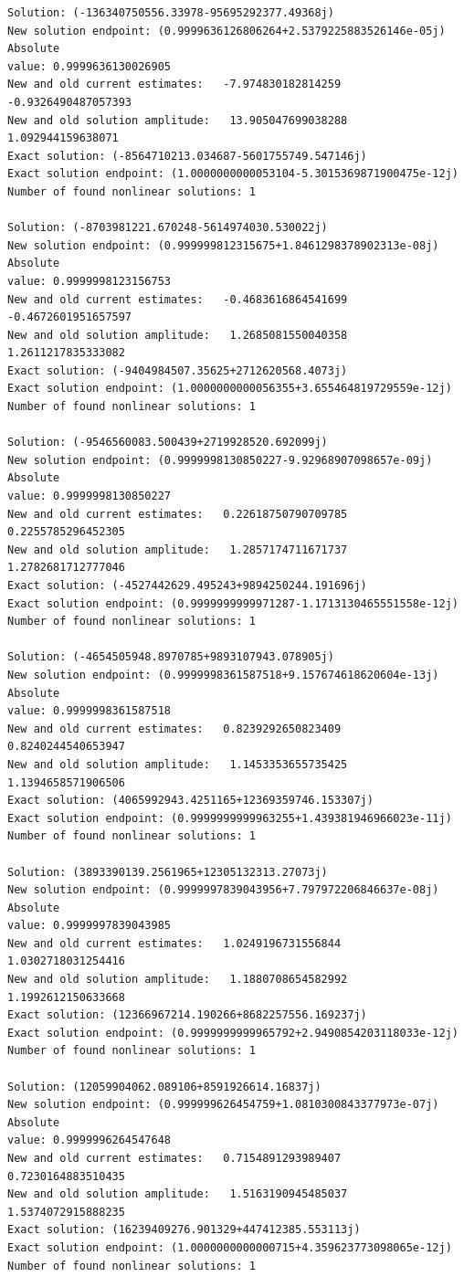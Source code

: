 \documentclass[11pt]{article}
\begin{document}
\begin{Verbatim}[commandchars=\\\{\}]
Solution: (-136340750556.33978-95695292377.49368j)
New solution endpoint: (0.9999636126806264+2.5379225883526146e-05j) Absolute
value: 0.9999636130026905
New and old current estimates:   -7.974830182814259    -0.9326490487057393
New and old solution amplitude:   13.905047699038288    1.092944159638071
Exact solution: (-8564710213.034687-5601755749.547146j)
Exact solution endpoint: (1.0000000000053104-5.3015369871900475e-12j)
Number of found nonlinear solutions: 1

Solution: (-8703981221.670248-5614974030.530022j)
New solution endpoint: (0.999999812315675+1.8461298378902313e-08j) Absolute
value: 0.9999998123156753
New and old current estimates:   -0.4683616864541699    -0.4672601951657597
New and old solution amplitude:   1.2685081550040358    1.2611217835333082
Exact solution: (-9404984507.35625+2712620568.4073j)
Exact solution endpoint: (1.0000000000056355+3.655464819729559e-12j)
Number of found nonlinear solutions: 1

Solution: (-9546560083.500439+2719928520.692099j)
New solution endpoint: (0.9999998130850227-9.92968907098657e-09j) Absolute
value: 0.9999998130850227
New and old current estimates:   0.22618750790709785    0.2255785296452305
New and old solution amplitude:   1.2857174711671737    1.2782681712777046
Exact solution: (-4527442629.495243+9894250244.191696j)
Exact solution endpoint: (0.9999999999971287-1.1713130465551558e-12j)
Number of found nonlinear solutions: 1

Solution: (-4654505948.8970785+9893107943.078905j)
New solution endpoint: (0.9999998361587518+9.157674618620604e-13j) Absolute
value: 0.9999998361587518
New and old current estimates:   0.8239292650823409    0.8240244540653947
New and old solution amplitude:   1.1453353655735425    1.1394658571906506
Exact solution: (4065992943.4251165+12369359746.153307j)
Exact solution endpoint: (0.9999999999963255+1.439381946966023e-11j)
Number of found nonlinear solutions: 1

Solution: (3893390139.2561965+12305132313.27073j)
New solution endpoint: (0.9999997839043956+7.797972206846637e-08j) Absolute
value: 0.9999997839043985
New and old current estimates:   1.0249196731556844    1.0302718031254416
New and old solution amplitude:   1.1880708654582992    1.1992612150633668
Exact solution: (12366967214.190266+8682257556.169237j)
Exact solution endpoint: (0.9999999999965792+2.9490854203118033e-12j)
Number of found nonlinear solutions: 1

Solution: (12059904062.089106+8591926614.16837j)
New solution endpoint: (0.999999626454759+1.0810300843377973e-07j) Absolute
value: 0.9999996264547648
New and old current estimates:   0.7154891293989407    0.7230164883510435
New and old solution amplitude:   1.5163190945485037    1.5374072915888235
Exact solution: (16239409276.901329+447412385.553113j)
Exact solution endpoint: (1.0000000000000715+4.359623773098065e-12j)
Number of found nonlinear solutions: 1


\end{Verbatim}
\end{document}
